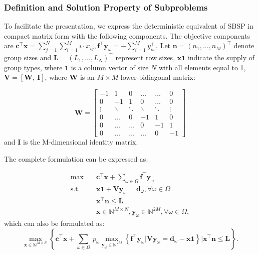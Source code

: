 \subsubsection{Definition and Solution Property of Subproblems}
To facilitate the presentation, we express the deterministic equivalent of SBSP in compact matrix form with the following components. The objective components are $\mathbf{c}^{\intercal}\mathbf{x} = \sum_{j =1}^{N} \sum_{i=1}^M i \cdot x_{ij}, \mathbf{f}^{\intercal}\mathbf{y}_{\omega} = -\sum_{i=1}^{M} y_{i \omega}^{+}$. Let $\mathbf{n} = (n_1, \ldots, n_M)^{\intercal}$ denote group sizes and $\mathbf{L} = (L_1, \ldots, L_N)^{\intercal}$ represent row sizes, $\mathbf{x} \mathbf{1}$ indicate the supply of group types, where $\mathbf{1}$ is a column vector of size $N$ with all elements equal to 1, $\mathbf{V} = [\mathbf{W}, ~\mathbf{I}]$, where $\mathbf{W}$ is an $M \times M$ lower-bidiagonal matrix:

$$
\mathbf{W}=\left[\begin{array}{cccccc}
-1 & 1 & 0 & \ldots & \ldots & 0 \\
0 & -1 & 1 &    0   & \ldots & 0 \\
\vdots & \ddots & \ddots & \ddots & \ddots & \vdots \\
0  & \ldots   &  0  & -1 & 1 & 0 \\
0  & \ldots   &  \ldots  &  0 &  -1 & 1 \\
0 & \ldots & \ldots & \ldots & 0 & -1
\end{array}\right]
$$
and $\mathbf{I}$ is the M-dimensional identity matrix.

The complete formulation can be expressed as:

\begin{equation}\label{BD_master}
  \begin{aligned}
  \max \quad & \mathbf{c}^{\intercal} \mathbf{x}+ \sum_{\omega \in \Omega} \mathbf{f}^{\intercal} \mathbf{y}_{\omega} \\
  \text {s.t.} \quad & \mathbf{x} \mathbf{1} + \mathbf{V} \mathbf{y}_{\omega} = \mathbf{d}_{\omega}, \forall \omega \in \Omega  \\
  & \mathbf{x}^{\intercal} \mathbf{n} \leq \mathbf{L} \\
  & \mathbf{x} \in \mathbb{N}^{M \times N}, \mathbf{y}_{\omega} \in \mathbb{N}^{2M}, \forall \omega \in \Omega, 
  \end{aligned}
\end{equation}
which can also be formulated as:
\begin{equation}\label{BD_master1}
  \max_{\mathbf{x} \in \mathbb{N}^{M \times N}} \left\{ \mathbf{c}^{\intercal} \mathbf{x} + \sum_{\omega \in \Omega} ~ p_{\omega} \max_{\mathbf{y}_{\omega} \in \mathbb{N}^{\scriptscriptstyle 2M}} \left\{\mathbf{f}^{\intercal} \mathbf{y}_{\omega} \big| \mathbf{V} \mathbf{y}_{\omega} = \mathbf{d}_{\omega} -\mathbf{x} \mathbf{1}\right\} \bigg| \mathbf{x}^{\intercal} \mathbf{n} \leq \mathbf{L} \right\}.
\end{equation}


